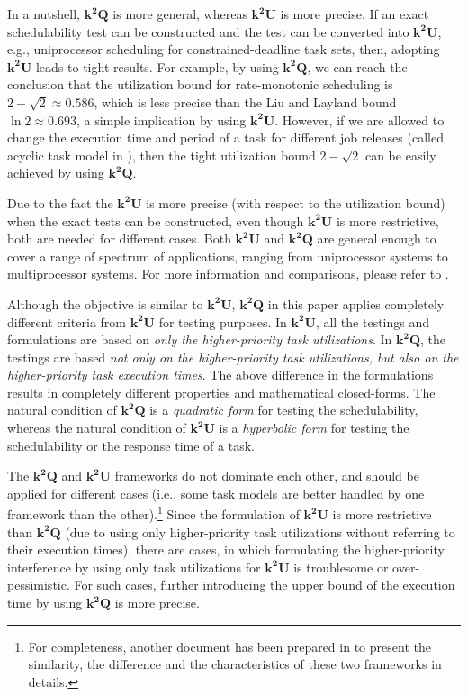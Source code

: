 \documentclass[10pt,conference]{IEEEtran}
\newcommand{\frameworkkq}[1]{$\mathbf{k^2Q}$}
\newcommand{\frameworkku}[1]{$\mathbf{k^2U}$}
\begin{document}
{In a nutshell, \frameworkkq{} is more general, whereas \frameworkku{} is
more precise. If an exact schedulability test can
be constructed and the test can be converted into \frameworkku{},
e.g., uniprocessor scheduling for constrained-deadline task sets,
then, adopting \frameworkku{} leads to tight results. For example, by using
\frameworkkq{}, we can reach the conclusion that the utilization bound
for rate-monotonic scheduling is $2-\sqrt{2} \approx 0.586$, which is
less precise than the Liu and Layland bound $\ln{2}\approx 0.693$,
 a simple implication by using \frameworkku{}. However, if we
are allowed to change the execution time and period of a task for
different job releases (called acyclic task model in
\cite{DBLP:journals/tc/AbdelzaherSL04}), then the tight utilization bound
$2-\sqrt{2}$ can be easily achieved by using \frameworkkq{}. 

Due to the fact the \frameworkku{} is more precise (with respect to the utilization bound) when the exact
tests can be constructed, even though \frameworkku{} is more
restrictive, both are needed for different
cases. Both \frameworkku{} and \frameworkkq{} are general enough to cover a range of spectrum of
applications, ranging from uniprocessor systems to multiprocessor
systems.  For more information and comparisons, please refer to
\cite{DBLP:journals/corr/framework-compare}.

}{
Although the objective is similar to \frameworkku{}, 
\frameworkkq{} in this paper applies completely different criteria from
\frameworkku{} for testing purposes. In \frameworkku{}, all the
testings and formulations are based on \emph{only the higher-priority
  task utilizations}. In \frameworkkq{}, the testings are based
\emph{not only on the higher-priority task utilizations, but also on
  the higher-priority task execution times}.  The above difference in
the formulations results in completely different properties and
mathematical closed-forms.  The natural condition of \frameworkkq{} is
a \emph{quadratic form} for testing the schedulability, whereas the
natural condition of \frameworkku{} is a \emph{hyperbolic form} for
testing the schedulability or the response time of a task.

The  \frameworkkq{} and \frameworkku{} frameworks do not dominate each other, and should be applied for different cases (i.e., some task models are better handled by one framework than the other).\footnote{For completeness, another document has been prepared in \cite{DBLP:journals/corr/framework-compare} to present the similarity, the difference and the characteristics of these two frameworks in details.}
Since the formulation of \frameworkku{} is more restrictive than
\frameworkkq{} (due to using only higher-priority task utilizations
without referring to their execution times), there are cases, in which
formulating the higher-priority interference by using only task
utilizations for \frameworkku{} is troublesome or over-pessimistic. For such cases,
further introducing the upper bound of the execution time by using
\frameworkkq{} is more precise. 
}
\end{document}
